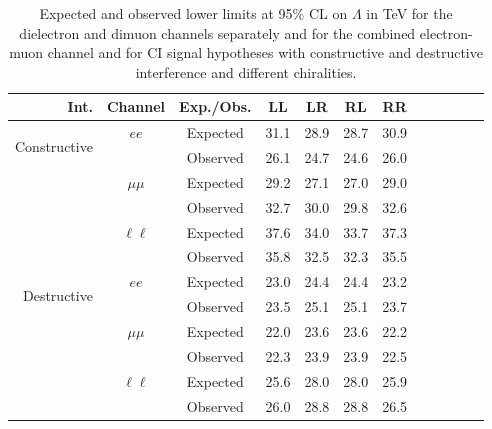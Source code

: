     \begin{table}[htp]
        \begin{center}        
        {\begin{tabular}{r c c c c c c c c c c c}\toprule
        Int. & Channel & Exp./Obs. & LL & LR & RL & RR \\
        \midrule
        \multirow{3}{*}[-1.5em]{\begin{sideways}Constructive\end{sideways}} & \multirow{2}{*}{$ee$} & Expected & 31.1 & 28.9 & 28.7 & 30.9 \\
        & & Observed & 26.1 & 24.7 & 24.6 & 26.0 \\
        \cmidrule{2-7}
         & \multirow{2}{*}{$\mu\mu$} & Expected & 29.2 & 27.1 & 27.0 & 29.0 \\
        & & Observed & 32.7 & 30.0 & 29.8 & 32.6 \\
        \cmidrule{2-7}
         & \multirow{2}{*}{$\ell\ell$} & Expected & 37.6 & 34.0 & 33.7 & 37.3 \\
        & & Observed & 35.8 & 32.5 & 32.3 & 35.5 \\
        \midrule
        \multirow{3}{*}[-1.5em]{\begin{sideways}Destructive\end{sideways}} & \multirow{2}{*}{$ee$} & Expected & 23.0 & 24.4 & 24.4 & 23.2 \\
        & & Observed & 23.5 & 25.1 & 25.1 & 23.7 \\
        \cmidrule{2-7}
         & \multirow{2}{*}{$\mu\mu$} & Expected & 22.0 & 23.6 & 23.6 & 22.2 \\
        & & Observed & 22.3 & 23.9 & 23.9 & 22.5 \\
        \cmidrule{2-7}
         & \multirow{2}{*}{$\ell\ell$} & Expected & 25.6 & 28.0 & 28.0 & 25.9 \\
        & & Observed & 26.0 & 28.8 & 28.8 & 26.5 \\
        \bottomrule\end{tabular}}
        \caption{Expected and observed lower limits at 95$\%$ CL on $\Lambda$ in TeV for the dielectron and dimuon channels separately and for the combined electron-muon channel and for CI signal hypotheses with constructive and destructive interference and different chiralities.}
        \label{tab:limits_on_lambda}
        \end{center}
    \end{table}

